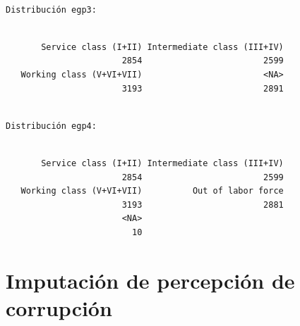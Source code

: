 \documentclass[
  spanish,
  a4paper,
  oneside]{scrbook}
\newenvironment{Shaded}{\begin{snugshade}}{\end{snugshade}}
\newcommand{\AttributeTok}[1]{\textcolor[rgb]{0.40,0.45,0.13}{#1}}
\newcommand{\CommentTok}[1]{\textcolor[rgb]{0.37,0.37,0.37}{#1}}
\newcommand{\FunctionTok}[1]{\textcolor[rgb]{0.28,0.35,0.67}{#1}}
\newcommand{\NormalTok}[1]{\textcolor[rgb]{0.00,0.23,0.31}{#1}}
\newcommand{\SpecialCharTok}[1]{\textcolor[rgb]{0.37,0.37,0.37}{#1}}
\newcommand{\StringTok}[1]{\textcolor[rgb]{0.13,0.47,0.30}{#1}}
\begin{document}
\begin{Shaded}
\end{Shaded}

\begin{verbatim}

Distribución egp3:
\end{verbatim}

\begin{verbatim}

       Service class (I+II) Intermediate class (III+IV) 
                       2854                        2599 
   Working class (V+VI+VII)                        <NA> 
                       3193                        2891 
\end{verbatim}

\begin{Shaded}
\end{Shaded}

\begin{verbatim}

Distribución egp4:
\end{verbatim}

\begin{verbatim}

       Service class (I+II) Intermediate class (III+IV) 
                       2854                        2599 
   Working class (V+VI+VII)          Out of labor force 
                       3193                        2881 
                       <NA> 
                         10 
\end{verbatim}

\chapter{Imputación de percepción de
corrupción}\label{imputaciuxf3n-de-percepciuxf3n-de-corrupciuxf3n}
\end{document}
